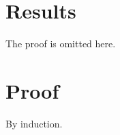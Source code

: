 \documentclass{article}
\begin{document}
\section{Results}
The proof is omitted here.
\appendix
\section{Proof}\label{app:proof}
By induction.
\end{document}
